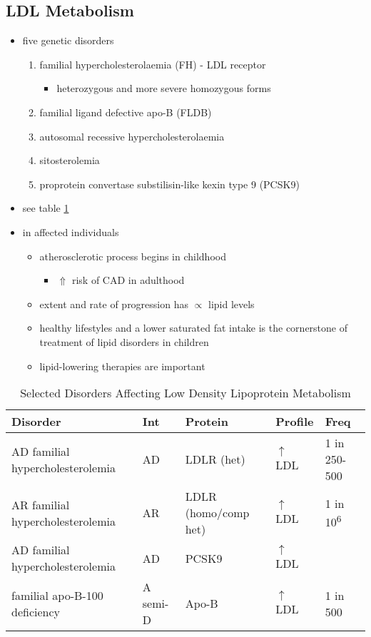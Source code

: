 \documentclass[12pt]{scrartcl}
\begin{document}
\subsection{LDL Metabolism}
\label{sec:orgf879a1c}
\begin{itemize}
\item five genetic disorders
\begin{enumerate}
\item familial hypercholesterolaemia (FH) - LDL receptor
\begin{itemize}
\item heterozygous and more severe homozygous forms
\end{itemize}
\item familial ligand defective apo-B (FLDB)
\item autosomal recessive hypercholesterolaemia
\item sitosterolemia
\item proprotein convertase substilisin-like kexin type 9 (PCSK9)
\end{enumerate}
\item see table \ref{tab:org607ba2c}
\item in affected individuals 
\begin{itemize}
\item atherosclerotic process begins in childhood
\begin{itemize}
\item \(\Uparrow\) risk of CAD in adulthood
\end{itemize}
\item extent and rate of progression has \(\propto\) lipid levels
\item healthy lifestyles and a lower saturated fat intake is the
cornerstone of treatment of lipid disorders in children
\item lipid-lowering therapies are important
\end{itemize}
\end{itemize}

\begin{table}[htbp]
\caption{\label{tab:org607ba2c}Selected Disorders Affecting Low Density Lipoprotein Metabolism}
\centering
\begin{tabular}{lllll}
Disorder & Int & Protein & Profile & Freq\\
\hline
AD familial hypercholesterolemia & AD & LDLR (het) & \(\uparrow\) LDL & 1 in 250-500\\
AR familial hypercholesterolemia & AR & LDLR (homo/comp het) & \(\uparrow\) LDL & 1 in 10\textsuperscript{6}\\
AD familial hypercholesterolemia & AD & PCSK9 & \(\uparrow\) LDL & \\
familial apo-B-100 deficiency & A semi-D & Apo-B & \(\uparrow\) LDL & 1 in 500\\
\end{tabular}
\end{table}
\end{document}
